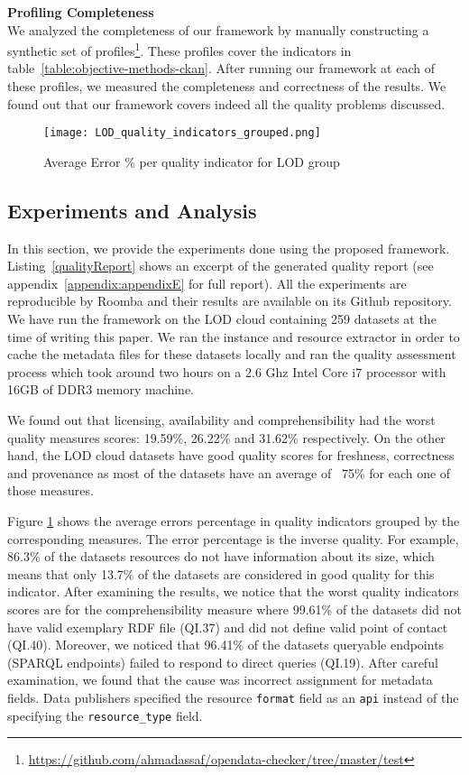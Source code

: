\textbf{Profiling Completeness}\\

We analyzed the completeness of our framework by manually constructing a synthetic set of profiles\footnote{\url{https://github.com/ahmadassaf/opendata-checker/tree/master/test}}. These profiles cover the indicators in table~\ref{table:objective-methods-ckan}. After running our framework at each of these profiles, we measured the completeness and correctness of the results. We found out that our framework covers indeed all the quality problems discussed.

\begin{figure}[ht]
  \centering
    \texttt{[image: LOD\_quality\_indicators\_grouped.png]}
  \caption{Average Error \% per quality indicator for LOD group}
  \label{fig:average-error-lod-group}
\end{figure}

\subsection{Experiments and Analysis}

In this section, we provide the experiments done using the proposed framework. Listing~\ref{qualityReport} shows an excerpt of the generated quality report (see appendix~\ref{appendix:appendixE} for full report). All the experiments are reproducible by Roomba and their results are available on its Github repository. We have run the framework on the LOD cloud containing 259 datasets at the time of writing this paper. We ran the instance and resource extractor in order to cache the metadata files for these datasets locally and ran the quality assessment process which took around two hours on a 2.6 Ghz Intel Core i7 processor with 16GB of DDR3 memory machine.

We found out that licensing, availability and comprehensibility had the worst quality measures scores: 19.59\%, 26.22\% and 31.62\% respectively. On the other hand, the LOD cloud datasets have good quality scores for freshness, correctness and provenance as most of the datasets have an average of ~75\% for each one of those measures.

Figure \ref{fig:average-error-lod-group} shows the average errors percentage in quality indicators grouped by the corresponding measures. The error percentage is the inverse quality. For example, 86.3\% of the datasets resources do not have information about its size, which means that only 13.7\% of the datasets are considered in good quality for this indicator. After examining the results, we notice that the worst quality indicators scores are for the comprehensibility measure where 99.61\% of the datasets did not have valid exemplary RDF file (QI.37) and did not define valid point of contact (QI.40). Moreover, we noticed that 96.41\% of the datasets queryable endpoints (SPARQL endpoints) failed to respond to direct queries (QI.19). After careful examination, we found that the cause was incorrect assignment for metadata fields. Data publishers specified the resource \texttt{format} field as an \texttt{api} instead of the specifying the \texttt{resource\_type} field.

